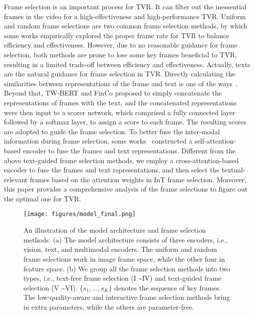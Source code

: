 \documentclass[11pt]{article}
\begin{document}
Frame selection is an important process for TVR.
It can filter out the inessential frames in the video for a high-effectiveness and high-performance TVR.
Uniform and random frame selections are two common frame selection methods, by which some works \cite{luo2022clip4clip, lei2021less} empirically explored the proper frame rate for TVR to balance efficiency and effectiveness.
However, due to no reasonable guidance for frame selection, both methods are prone to lose some key frames beneficial to TVR, resulting in a limited trade-off between efficiency and effectiveness.
Actually, texts are the natural guidance for frame selection in TVR.
Directly calculating the similarities between representations of the frame and text is one of the ways~\cite{gorti2022x, han2022efficient}.
Beyond that, TW-BERT and FinCo \cite{yang2023learning, wang2022contrastive} proposed to simply concatenate the representations of frames with the text, and the concatenated representations were then input to a scorer network, which comprised a fully connected layer followed by a softmax layer, to assign a score to each frame.
The resulting scores are adopted to guide the frame selection.
To better fuse the inter-modal information during frame selection, some works~\cite{buch2022revisiting, lin2022smaug} constructed a self-attention-based encoder to fuse the frames and text representations.
Different from the above text-guided frame selection methods, we employ a cross-attention-based encoder to fuse the frames and text representations, and then select the textual-relevant frames based on the attention weights in InT frame selection.
Moreover, this paper provides a comprehensive analysis of the frame selections to figure out the optimal one for TVR.

\begin{figure*}[htbp]
\setlength{\abovecaptionskip}{0.2cm}
\centering
\texttt{[image: figures/model\_final.png]}
\caption{An illustration of the model architecture and frame selection methods. 
(a) The model architecture consists of three encoders, i.e., vision, text, and multimodal encoders.
The uniform and random frame selections work in image frame space, while the other four in feature space.
(b) We group all the frame selection methods into two types, i.e., text-free frame selection (I \textasciitilde IV) and text-guided frame selection (V \textasciitilde VI).
$\{s_1, ..., s_K\}$ denotes the sequence of key frames.
The low-quality-aware and interactive frame selection methods bring in extra parameters, while the others are parameter-free.
} \label{structure}
\vspace{-0.5cm}
\end{figure*}
\end{document}
